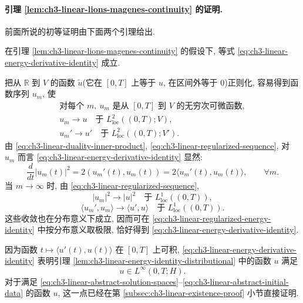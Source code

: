\hypertarget{chapter-03-page-192}{}
\paragraph{引理 \ref{lem:ch3-linear-lions-magenes-continuity} 的证明.}
前面所说的初等证明由下面两个引理给出.

\begin{Lemma}
\label{lem:ch3-linear-energy-identity-distributional}
在引理 \ref{lem:ch3-linear-lions-magenes-continuity} 的假设下, 等式 \eqref{eq:ch3-linear-energy-derivative-identity} 成立.
\end{Lemma}

\begin{Proof}
把从 $\mathbb R$ 到 $V$ 的函数 $\widetilde u$(它在 $[0,T]$ 上等于 $u$, 在区间外等于 $0$)正则化, 容易得到函数序列 $u_m$, 使
\begin{equation}
\begin{gathered}
\text{对每个 }m,\ u_m\text{ 是从 }[0,T]\text{ 到 }V\text{ 的无穷次可微函数},\\
u_m\longrightarrow u\quad\text{于 }L^2_{\mathrm{loc}}((0,T);V),\\
u_m'\longrightarrow u'\quad\text{于 }L^2_{\mathrm{loc}}((0,T);V').
\end{gathered}
\label{eq:ch3-linear-regularized-sequence}
\end{equation}
由 \eqref{eq:ch3-linear-duality-inner-product}, \eqref{eq:ch3-linear-regularized-sequence}, 对 $u_m$ 而言 \eqref{eq:ch3-linear-energy-derivative-identity} 显然:
\begin{equation}
\frac d{dt}|u_m(t)|^2
=2(u_m'(t),u_m(t))
=2\langle u_m'(t),u_m(t)\rangle,
\qquad\forall m.
\label{eq:ch3-linear-regularized-energy-identity}
\end{equation}
当 $m\to\infty$ 时, 由 \eqref{eq:ch3-linear-regularized-sequence},
\[
|u_m|^2\longrightarrow|u|^2
\quad\text{于 }L^1_{\mathrm{loc}}((0,T)),
\]
\[
\langle u_m',u_m\rangle\longrightarrow\langle u',u\rangle
\quad\text{于 }L^1_{\mathrm{loc}}((0,T)).
\]
这些收敛也在分布意义下成立, 因而可在 \eqref{eq:ch3-linear-regularized-energy-identity} 中按分布意义取极限, 恰好得到 \eqref{eq:ch3-linear-energy-derivative-identity}.
\end{Proof}

因为函数 $t\mapsto\langle u'(t),u(t)\rangle$ 在 $[0,T]$ 上可积, \eqref{eq:ch3-linear-energy-derivative-identity} 表明引理 \ref{lem:ch3-linear-energy-identity-distributional} 中的函数 $u$ 满足
\begin{equation}
u\in L^\infty(0,T;H).
\label{eq:ch3-linear-energy-linfty-consequence}
\end{equation}
对于满足 \eqref{eq:ch3-linear-abstract-solution-spaces}--\eqref{eq:ch3-linear-abstract-initial-data} 的函数 $u$, 这一点已经在第 \ref{subsec:ch3-linear-existence-proof} 小节直接证明.

